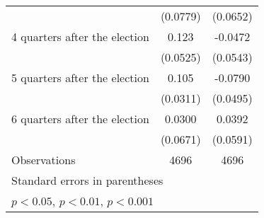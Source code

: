 \begin{table}[htbp]
\begin{tabular}{l*{2}{c}}
                    &    (0.0779)         &    (0.0652)         \\
[1em]
 4 quarters after the election&       0.123\sym{*}  &     -0.0472         \\
                    &    (0.0525)         &    (0.0543)         \\
[1em]
 5 quarters after the election&       0.105\sym{***}&     -0.0790         \\
                    &    (0.0311)         &    (0.0495)         \\
[1em]
 6 quarters after the election&      0.0300         &      0.0392         \\
                    &    (0.0671)         &    (0.0591)         \\
\hline
Observations        &        4696         &        4696         \\
\hline\hline
\multicolumn{3}{l}{\footnotesize Standard errors in parentheses}\\
\multicolumn{3}{l}{\footnotesize \sym{*} \(p<0.05\), \sym{**} \(p<0.01\), \sym{***} \(p<0.001\)}\\
\end{tabular}
\end{table}

